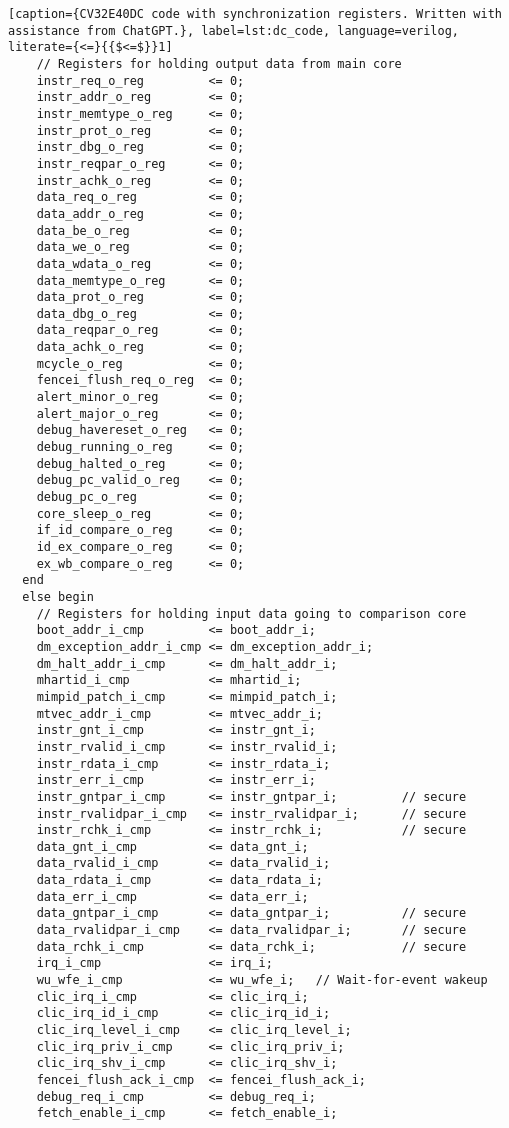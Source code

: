 \begin{lstlisting}[caption={CV32E40DC code with synchronization registers. Written with assistance from ChatGPT.}, label=lst:dc_code, language=verilog, literate={<=}{{$<=$}}1]
    // Registers for holding output data from main core 
    instr_req_o_reg         <= 0;
    instr_addr_o_reg        <= 0;
    instr_memtype_o_reg     <= 0;
    instr_prot_o_reg        <= 0;
    instr_dbg_o_reg         <= 0;
    instr_reqpar_o_reg      <= 0;
    instr_achk_o_reg        <= 0;
    data_req_o_reg          <= 0;  
    data_addr_o_reg         <= 0;
    data_be_o_reg           <= 0;
    data_we_o_reg           <= 0;
    data_wdata_o_reg        <= 0;
    data_memtype_o_reg      <= 0;
    data_prot_o_reg         <= 0;
    data_dbg_o_reg          <= 0;
    data_reqpar_o_reg       <= 0;
    data_achk_o_reg         <= 0;
    mcycle_o_reg            <= 0;
    fencei_flush_req_o_reg  <= 0;
    alert_minor_o_reg       <= 0;
    alert_major_o_reg       <= 0;
    debug_havereset_o_reg   <= 0;
    debug_running_o_reg     <= 0;
    debug_halted_o_reg      <= 0;
    debug_pc_valid_o_reg    <= 0;
    debug_pc_o_reg          <= 0;
    core_sleep_o_reg        <= 0;
    if_id_compare_o_reg     <= 0;
    id_ex_compare_o_reg     <= 0;
    ex_wb_compare_o_reg     <= 0;
  end
  else begin
    // Registers for holding input data going to comparison core
    boot_addr_i_cmp         <= boot_addr_i;
    dm_exception_addr_i_cmp <= dm_exception_addr_i;
    dm_halt_addr_i_cmp      <= dm_halt_addr_i;
    mhartid_i_cmp           <= mhartid_i;
    mimpid_patch_i_cmp      <= mimpid_patch_i;
    mtvec_addr_i_cmp        <= mtvec_addr_i;
    instr_gnt_i_cmp         <= instr_gnt_i;
    instr_rvalid_i_cmp      <= instr_rvalid_i;
    instr_rdata_i_cmp       <= instr_rdata_i;
    instr_err_i_cmp         <= instr_err_i;
    instr_gntpar_i_cmp      <= instr_gntpar_i;         // secure
    instr_rvalidpar_i_cmp   <= instr_rvalidpar_i;      // secure
    instr_rchk_i_cmp        <= instr_rchk_i;           // secure
    data_gnt_i_cmp          <= data_gnt_i;
    data_rvalid_i_cmp       <= data_rvalid_i;
    data_rdata_i_cmp        <= data_rdata_i;
    data_err_i_cmp          <= data_err_i;
    data_gntpar_i_cmp       <= data_gntpar_i;          // secure
    data_rvalidpar_i_cmp    <= data_rvalidpar_i;       // secure
    data_rchk_i_cmp         <= data_rchk_i;            // secure
    irq_i_cmp               <= irq_i;
    wu_wfe_i_cmp            <= wu_wfe_i;   // Wait-for-event wakeup
    clic_irq_i_cmp          <= clic_irq_i;
    clic_irq_id_i_cmp       <= clic_irq_id_i;
    clic_irq_level_i_cmp    <= clic_irq_level_i;
    clic_irq_priv_i_cmp     <= clic_irq_priv_i;
    clic_irq_shv_i_cmp      <= clic_irq_shv_i;
    fencei_flush_ack_i_cmp  <= fencei_flush_ack_i;
    debug_req_i_cmp         <= debug_req_i;
    fetch_enable_i_cmp      <= fetch_enable_i;
 

\end{lstlisting}
